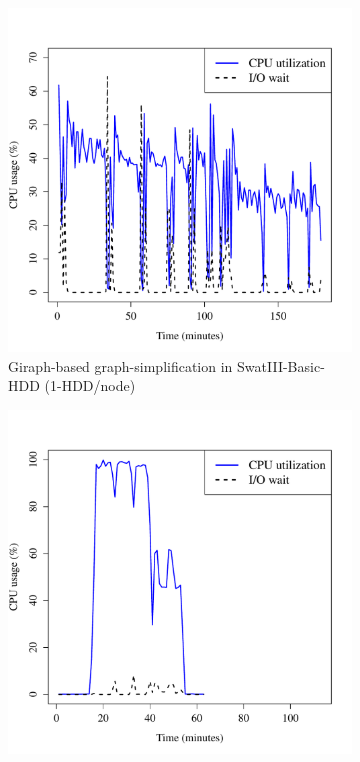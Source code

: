 \documentclass[conference]{IEEEtran}
\begin{document}
\begin{figure}[htb]
\begin{subfigure}[b]{0.23\textwidth}
                \includegraphics[width=\textwidth]{Figure/SystemData/Plots/ECCPUHDD.pdf}
                \caption{Giraph-based graph-simplification in SwatIII-Basic-HDD (1-HDD/node)}
                \label{fig:ECCPUHDD}
        \end{subfigure} 
        \begin{subfigure}[b]{0.23\textwidth}
                \includegraphics[width=\textwidth]{Figure/SystemData/Plots/BGCPUSSD.pdf}

\end{subfigure}
\end{figure}
\end{document}
